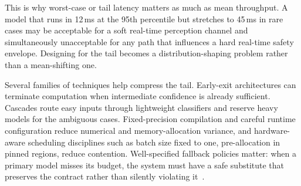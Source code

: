 \documentclass[smallextended]{svjour3}
\begin{document}
This is why worst-case or tail latency matters as much as mean throughput. A model that runs in 12\,ms at the 95th percentile but stretches to 45\,ms in rare cases may be acceptable for a soft real-time perception channel and simultaneously unacceptable for any path that influences a hard real-time safety envelope. Designing for the tail becomes a distribution-shaping problem rather than a mean-shifting one.

Several families of techniques help compress the tail. Early-exit architectures can terminate computation when intermediate confidence is already sufficient. Cascades route easy inputs through lightweight classifiers and reserve heavy models for the ambiguous cases. Fixed-precision compilation and careful runtime configuration reduce numerical and memory-allocation variance, and hardware-aware scheduling disciplines such as batch size fixed to one, pre-allocation in pinned regions, reduce contention. Well-specified fallback policies matter: when a primary model misses its budget, the system must have a safe substitute that preserves the contract rather than silently violating it~\cite{sze2017,amalou2023cawet}.
\end{document}
